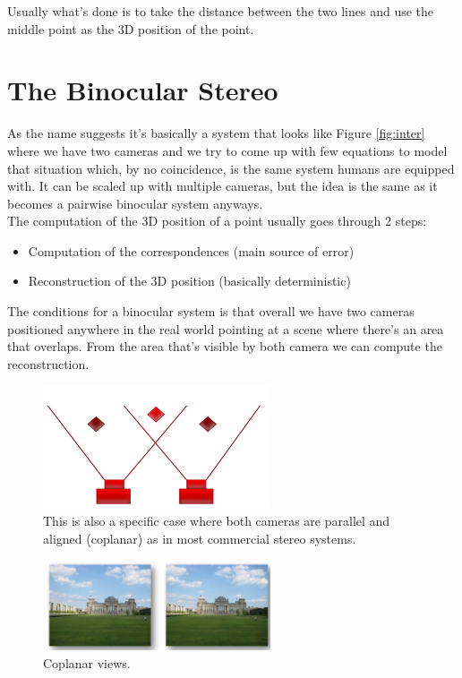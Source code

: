 Usually what's done is to take the distance between the two lines and use the middle point as the 3D position of the point. 

\section{The Binocular Stereo}

As the name suggests it's basically a system that looks like Figure \ref{fig:inter} where we have two cameras and we try to come up with few equations to model that situation which, by no coincidence, is the same system humans are equipped with. It can be scaled up with multiple cameras, but the idea is the same as it becomes a pairwise binocular system anyways. 
\\The computation of the 3D position of a point usually goes through 2 steps:
\begin{itemize}
    \item Computation of the correspondences (main source of error) 
    \item Reconstruction of the 3D position (basically deterministic)
\end{itemize}

The conditions for a binocular system is that overall we have two cameras positioned anywhere in the real world pointing at a scene where there's an area that overlaps. From the area that's visible by both camera we can compute the reconstruction.

\begin{figure}[H]
    \centering
    \includegraphics[width=0.6\textwidth]{Figures/binoc.png}
    \caption{This is also a specific case where both cameras are parallel and aligned (coplanar) as in most commercial stereo systems.}
    \label{fig:binoc}
\end{figure}




\begin{figure}[h!]
    \centering
    \includegraphics[width=0.6\textwidth]{Figures/coplan.png}
    \caption{Coplanar views.}
    \label{fig:coplan}
\end{figure}

